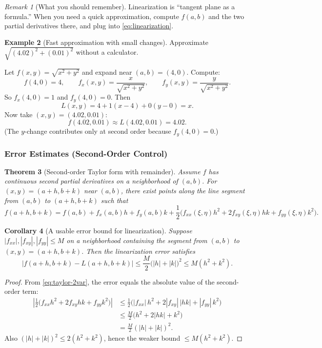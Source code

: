 \documentclass[12pt]{article}
\numberwithin{equation}{section}
\theoremstyle{plain}
\newtheorem{theorem}{Theorem}[section]
\newtheorem{corollary}[theorem]{Corollary}
\theoremstyle{definition}
\newtheorem{example}[theorem]{Example}
\theoremstyle{remark}
\newtheorem{remark}[theorem]{Remark}
\begin{document}
\begin{remark}[What you should remember]
Linearization is “tangent plane as a formula.”  
When you need a quick approximation, compute $f(a,b)$ and the two partial derivatives there, and plug into \cref{eq:linearization}.
\end{remark}

\begin{example}[Fast approximation with small changes]
Approximate $\sqrt{(4.02)^2 + (0.01)^2}$ without a calculator.

Let $f(x,y)=\sqrt{x^2+y^2}$ and expand near $(a,b)=(4,0)$.  
Compute:
\[
f(4,0)=4,\qquad
f_x(x,y)=\frac{x}{\sqrt{x^2+y^2}},\qquad
f_y(x,y)=\frac{y}{\sqrt{x^2+y^2}}.
\]
So $f_x(4,0)=1$ and $f_y(4,0)=0$. Then
\[
L(x,y)=4+1(x-4)+0(y-0)=x.
\]
Now take $(x,y)=(4.02,0.01)$:
\[
f(4.02,0.01)\approx L(4.02,0.01)=4.02.
\]
(The $y$-change contributes only at second order because $f_y(4,0)=0$.)
\end{example}

\subsubsection{Error Estimates (Second-Order Control)}

\begin{theorem}[Second-order Taylor form with remainder]\label{thm:taylor-2var}
Assume $f$ has continuous second partial derivatives on a neighborhood of $(a,b)$.  
For $(x,y)=(a+h,b+k)$ near $(a,b)$, there exist points along the line segment from $(a,b)$ to $(a+h,b+k)$ such that
\begin{equation}\label{eq:taylor-2var}
f(a+h,b+k)=f(a,b)+f_x(a,b)h+f_y(a,b)k+\frac12\Big(f_{xx}(\xi,\eta)h^2+2f_{xy}(\xi,\eta)hk+f_{yy}(\xi,\eta)k^2\Big).
\end{equation}
\end{theorem}

\begin{corollary}[A usable error bound for linearization]\label{cor:error-bound}
Suppose $|f_{xx}|,|f_{xy}|,|f_{yy}| \le M$ on a neighborhood containing the segment from $(a,b)$ to $(x,y)=(a+h,b+k)$.  
Then the linearization error satisfies
\begin{equation}\label{eq:error-bound}
|f(a+h,b+k)-L(a+h,b+k)|
\le \frac{M}{2}\big(|h|+|k|\big)^2
\le M(h^2+k^2).
\end{equation}
\end{corollary}

\begin{proof}
From \cref{eq:taylor-2var}, the error equals the absolute value of the second-order term:
\begin{align*}
\left|\frac12\big(f_{xx}h^2+2f_{xy}hk+f_{yy}k^2\big)\right|
&\le \frac12\Big(|f_{xx}|\,h^2+2|f_{xy}|\,|hk|+|f_{yy}|\,k^2\Big) \\
&\le \frac{M}{2}\big(h^2+2|hk|+k^2\big) \\
&= \frac{M}{2}(|h|+|k|)^2.
\end{align*}
Also $(|h|+|k|)^2 \le 2(h^2+k^2)$, hence the weaker bound $\le M(h^2+k^2)$.
\end{proof}
\end{document}
